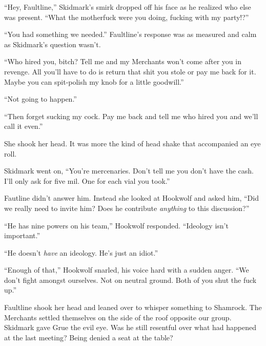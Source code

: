 ``Hey, Faultline,'' Skidmark's smirk dropped off his face as he realized who else was present.  ``What the motherfuck were you doing, fucking with my party!?''



``You had something we needed.''  Faultline's response was as measured and calm as Skidmark's question wasn't.



``Who hired you, bitch?  Tell me and my Merchants won't come after you in revenge.  All you'll have to do is return that shit you stole or pay me back for it.  Maybe you can spit-polish my knob for a little goodwill.''



``Not going to happen.''



``Then forget sucking my cock.  Pay me back and tell me who hired you and we'll call it even.''



She shook her head.  It was more the kind of head shake that accompanied an eye roll.



Skidmark went on, ``You're mercenaries.  Don't tell me you don't have the cash.  I'll only ask for five mil.  One for each vial you took.''



Fautline didn't answer him.  Instead she looked at Hookwolf and asked him, ``Did we really need to invite him?  Does he contribute \emph{anything} to this discussion?''



``He has nine powers on his team,'' Hookwolf responded.  ``Ideology isn't important.''



``He doesn't \emph{have} an ideology.  He's just an idiot.''



``Enough of that,'' Hookwolf snarled, his voice hard with a sudden anger.  ``We don't fight amongst ourselves.  Not on neutral ground.  Both of you shut the fuck up.''



Faultline shook her head and leaned over to whisper something to Shamrock.  The Merchants settled themselves on the side of the roof opposite our group.  Skidmark gave Grue the evil eye.  Was he still resentful over what had happened at the last meeting?  Being denied a seat at the table?



